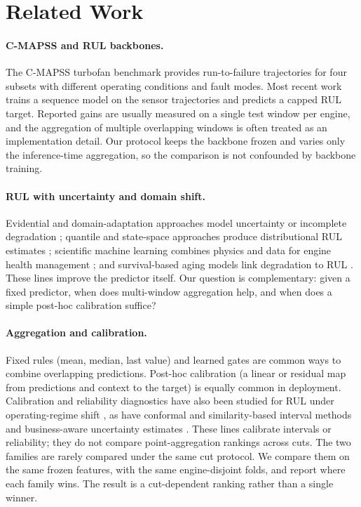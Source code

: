 \section{Related Work}
\label{sec:related}

\paragraph{C-MAPSS and RUL backbones.}
The C-MAPSS turbofan benchmark \cite{saxena2008} provides run-to-failure
trajectories for four subsets with different operating conditions and fault
modes. Most recent work trains a sequence model on the sensor trajectories and
predicts a capped RUL target. Reported gains are usually measured on a single
test window per engine, and the aggregation of multiple overlapping windows is
often treated as an implementation detail. Our protocol keeps the backbone frozen
and varies only the inference-time aggregation, so the comparison is not
confounded by backbone training.

\paragraph{RUL with uncertainty and domain shift.}
Evidential and domain-adaptation approaches model uncertainty or incomplete
degradation \cite{hou2025}; quantile and state-space approaches produce
distributional RUL estimates \cite{frizzo2025}; scientific machine learning
combines physics and data for engine health management \cite{barry2026}; and
survival-based aging models link degradation to RUL \cite{srinivasan2026}. These
lines improve the predictor itself. Our question is complementary: given a fixed
predictor, when does multi-window aggregation help, and when does a simple
post-hoc calibration suffice?

\paragraph{Aggregation and calibration.}
Fixed rules (mean, median, last value) and learned gates are common ways to
combine overlapping predictions. Post-hoc calibration (a linear or residual map
from predictions and context to the target) is equally common in deployment.
Calibration and reliability diagnostics have also been studied for RUL under
operating-regime shift \cite{yang2026}, as have conformal and similarity-based
interval methods \cite{busico2026,barber2023} and business-aware uncertainty
estimates \cite{frizzo2026}. These lines calibrate intervals or reliability;
they do not compare point-aggregation rankings across cuts.
The two families are rarely compared under the same cut protocol. We compare
them on the same frozen features, with the same engine-disjoint folds, and
report where each family wins. The result is a cut-dependent ranking rather than
a single winner.

